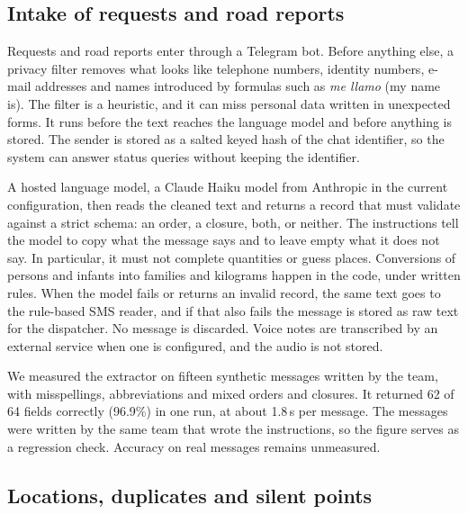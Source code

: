 \documentclass[11pt]{article}
\begin{document}
\subsection{Intake of requests and road reports}

Requests and road reports enter through a Telegram bot. Before anything else, a privacy filter removes what looks like telephone numbers, identity numbers, e-mail addresses and names introduced by formulas such as \emph{me llamo} (my name is). The filter is a heuristic, and it can miss personal data written in unexpected forms. It runs before the text reaches the language model and before anything is stored. The sender is stored as a salted keyed hash of the chat identifier, so the system can answer status queries without keeping the identifier.

A hosted language model, a Claude Haiku model from Anthropic in the current configuration, then reads the cleaned text and returns a record that must validate against a strict schema: an order, a closure, both, or neither. %
The instructions tell the model to copy what the message says and to leave empty what it does not say. In particular, it must not complete quantities or guess places. Conversions of persons and infants into families and kilograms happen in the code, under written rules. When the model fails or returns an invalid record, the same text goes to the rule-based SMS reader, and if that also fails the message is stored as raw text for the dispatcher. No message is discarded. Voice notes are transcribed by an external service when one is configured, and the audio is not stored.

We measured the extractor on fifteen synthetic messages written by the team, with misspellings, abbreviations and mixed orders and closures. It returned 62 of 64 fields correctly (96.9\%) in one run, at about 1.8\,s per message. The messages were written by the same team that wrote the instructions, so the figure serves as a regression check. Accuracy on real messages remains unmeasured.

\subsection{Locations, duplicates and silent points}
\end{document}
